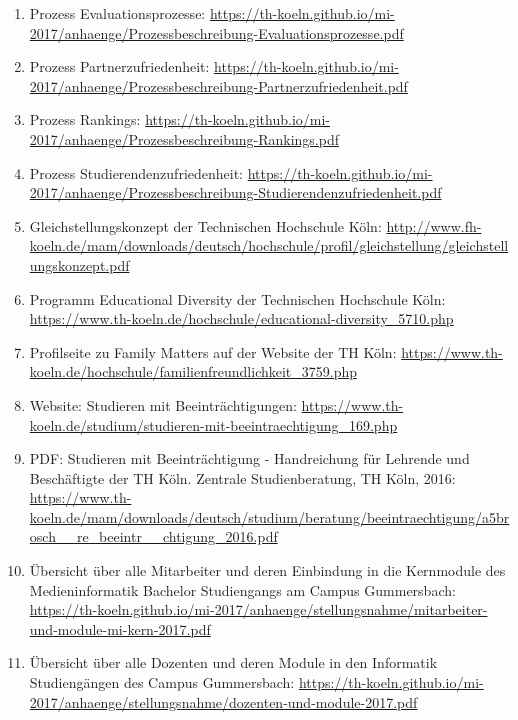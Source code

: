 \documentclass[BCOR12mm,DIV11,titlepage,a4paper,oneside,10pt]{scrbook}
\begin{document}
\begin{sloppypar}
\begin{flushleft}
\begin{enumerate}
\item{Prozess Evaluationsprozesse: \url{https://th-koeln.github.io/mi-2017/anhaenge/Prozessbeschreibung-Evaluationsprozesse.pdf} } 
\item{Prozess Partnerzufriedenheit: \url{https://th-koeln.github.io/mi-2017/anhaenge/Prozessbeschreibung-Partnerzufriedenheit.pdf} } 
\item{Prozess Rankings: \url{https://th-koeln.github.io/mi-2017/anhaenge/Prozessbeschreibung-Rankings.pdf} } 
\item{Prozess Studierendenzufriedenheit: \url{https://th-koeln.github.io/mi-2017/anhaenge/Prozessbeschreibung-Studierendenzufriedenheit.pdf} } 
\item{Gleichstellungskonzept der Technischen Hochschule Köln: \url{http://www.fh-koeln.de/mam/downloads/deutsch/hochschule/profil/gleichstellung/gleichstellungskonzept.pdf} } 
\item{Programm Educational Diversity der Technischen Hochschule Köln: \url{https://www.th-koeln.de/hochschule/educational-diversity\_5710.php} } 
\item{Profilseite zu Family Matters auf der Website der TH Köln: \url{https://www.th-koeln.de/hochschule/familienfreundlichkeit\_3759.php} } 
\item{Website: Studieren mit Beeinträchtigungen: \url{https://www.th-koeln.de/studium/studieren-mit-beeintraechtigung\_169.php} } 
\item{PDF: Studieren mit Beeinträchtigung - Handreichung für Lehrende und Beschäftigte der TH Köln. Zentrale Studienberatung, TH Köln, 2016: \url{https://www.th-koeln.de/mam/downloads/deutsch/studium/beratung/beeintraechtigung/a5brosch\_\_re\_beeintr\_\_chtigung\_2016.pdf} } 
\item{Übersicht über alle Mitarbeiter und deren Einbindung in die Kernmodule des Medieninformatik Bachelor Studiengangs am Campus Gummersbach: \url{https://th-koeln.github.io/mi-2017/anhaenge/stellungsnahme/mitarbeiter-und-module-mi-kern-2017.pdf} } 
\item{Übersicht über alle Dozenten und deren Module in den Informatik Studiengängen des Campus Gummersbach: \url{https://th-koeln.github.io/mi-2017/anhaenge/stellungsnahme/dozenten-und-module-2017.pdf} } 

\end{enumerate}

\end{flushleft}
\end{sloppypar}

\backmatter
\end{document}
